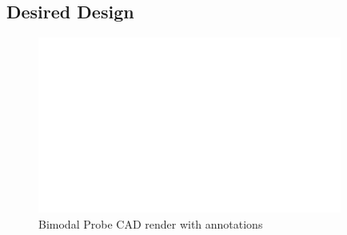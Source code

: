 \subsection{Desired Design}
\begin{figure}[h!]\centering \includegraphics[width=10cm,draft]{figures/foo.png}
      \caption{Bimodal Probe CAD render with annotations}
\end{figure}


